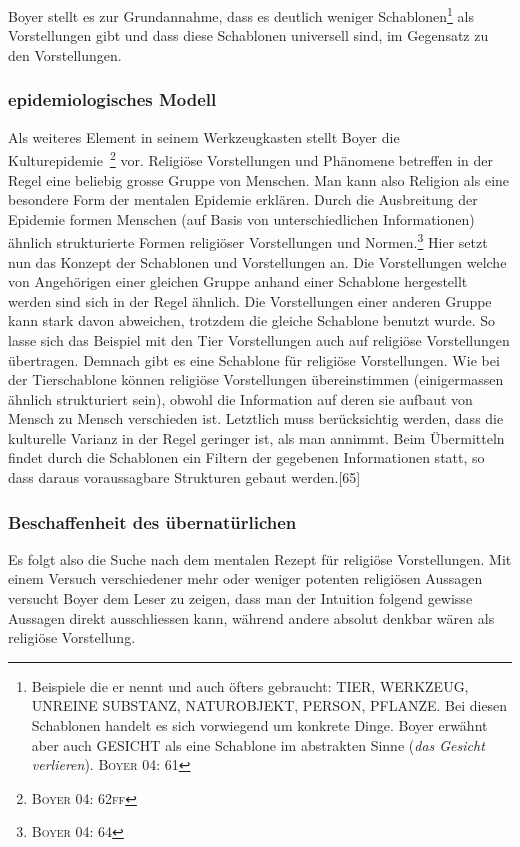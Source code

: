 Boyer stellt es zur Grundannahme, dass es deutlich weniger Schablonen\footnote{Beispiele die er nennt und auch öfters gebraucht: TIER, WERKZEUG, UNREINE SUBSTANZ, NATUROBJEKT, PERSON, PFLANZE. Bei diesen Schablonen handelt es sich vorwiegend um konkrete Dinge. Boyer erwähnt aber auch GESICHT als eine Schablone im abstrakten Sinne (\emph{das Gesicht verlieren}). \textsc{Boyer 04: 61}} als Vorstellungen gibt und dass diese Schablonen universell sind, im Gegensatz zu den Vorstellungen. 

\subsubsection*{epidemiologisches Modell}
Als weiteres Element in seinem Werkzeugkasten stellt Boyer die Kulturepidemie~\footnote{\textsc{Boyer 04: 62ff}} vor. Religiöse Vorstellungen und Phänomene betreffen in der Regel eine beliebig grosse Gruppe von Menschen.
Man kann also Religion als eine besondere Form der mentalen Epidemie erklären. Durch die Ausbreitung der Epidemie formen Menschen (auf Basis von unterschiedlichen Informationen) ähnlich strukturierte Formen religiöser Vorstellungen und Normen.\footnote{\textsc{Boyer 04: 64}} Hier setzt nun das Konzept der Schablonen und Vorstellungen an. Die Vorstellungen welche von Angehörigen einer gleichen Gruppe anhand einer Schablone hergestellt werden sind sich in der Regel ähnlich. Die Vorstellungen einer anderen Gruppe kann stark davon abweichen, trotzdem die gleiche Schablone benutzt wurde. So lasse sich das Beispiel mit den Tier Vorstellungen auch auf religiöse Vorstellungen übertragen. Demnach gibt es eine Schablone für religiöse Vorstellungen. Wie bei der Tierschablone können religiöse Vorstellungen übereinstimmen (einigermassen ähnlich strukturiert sein), obwohl die Information auf deren sie aufbaut von Mensch zu Mensch verschieden ist. Letztlich muss berücksichtig werden, dass die kulturelle Varianz in der Regel geringer ist, als man annimmt. Beim Übermitteln findet durch die Schablonen ein Filtern der gegebenen Informationen statt, so dass daraus voraussagbare Strukturen gebaut werden.[65]

\subsubsection*{Beschaffenheit des übernatürlichen}
Es folgt also die Suche nach dem mentalen Rezept für religiöse Vorstellungen. Mit einem Versuch verschiedener mehr oder weniger potenten religiösen Aussagen versucht Boyer dem Leser zu zeigen, dass man der Intuition folgend gewisse Aussagen direkt ausschliessen kann, während andere absolut denkbar wären als religiöse Vorstellung. 

